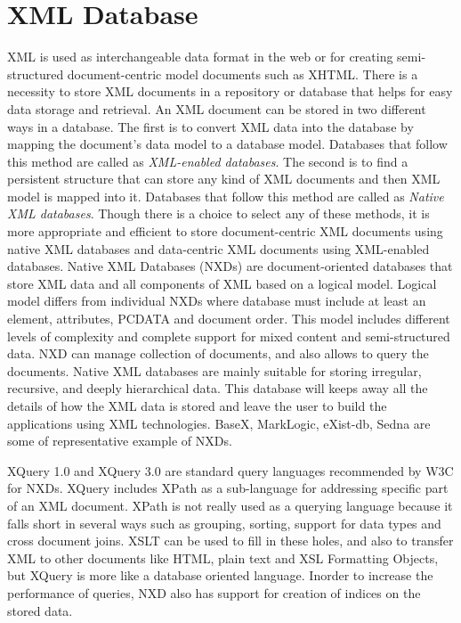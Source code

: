 \section{XML Database}

  XML is used as interchangeable data format in the web or for creating semi-structured document-centric model documents such as XHTML. There is a necessity to store XML documents in a repository or database that helps for easy data storage and retrieval. An XML document can be stored in two different ways in a database. The first is to convert XML data into the database by mapping the document's data model to a database model. Databases that follow this method are called as \textit{XML-enabled databases}. The second is to find a persistent structure that can store any kind of XML documents and then XML model is mapped into it. Databases that follow this method are called as \textit{Native XML databases}\cite{pavlovic2007native}. Though there is a choice to select any of these methods, it is more appropriate and efficient to store document-centric XML documents using native XML databases and data-centric XML documents using XML-enabled databases.	Native XML Databases (NXDs) are document-oriented databases that store XML data and all components of XML based on a logical model. Logical model differs from individual NXDs where database must include at least an element, attributes, PCDATA and document order. This model includes different levels of complexity and complete support for mixed content and semi-structured data. NXD can manage collection of documents, and also allows to query the documents. Native XML databases are mainly suitable for storing irregular, recursive, and deeply hierarchical data. This database will keeps away all the details of how the XML data is stored and leave the user to build the applications using XML technologies.  BaseX, MarkLogic, eXist-db, Sedna are some of representative example of  NXDs. 
  \par XQuery 1.0 and XQuery 3.0 are standard query languages recommended by W3C for NXDs. XQuery includes XPath as a sub-language for addressing specific part of an XML document. XPath is not really used as a querying language because it falls short in several ways such as grouping, sorting, support for data types and cross document joins. XSLT can be used to fill in these holes, and also to transfer XML to other documents like HTML, plain text and XSL Formatting Objects, but XQuery is more like a database oriented language.  Inorder to increase the performance of queries, NXD also has support for creation of indices on the stored data.\cite{pavlovic2007native}

